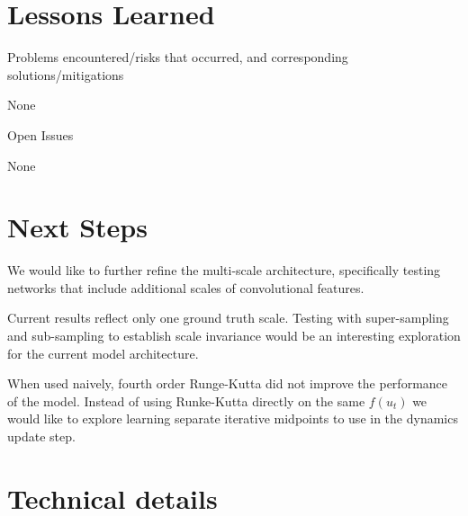 \documentclass[12pt]{article}
\theoremstyle{plain}
\theoremstyle{remark}
\theoremstyle{definition}
\begin{document}
\section{Lessons Learned}


\noindent Problems encountered/risks that occurred, and corresponding solutions/mitigations

None

\noindent Open Issues

None

\section{Next Steps}

\noindent We would like to further refine the multi-scale architecture, specifically testing networks that include additional scales of convolutional features.


\noindent Current results reflect only one ground truth scale. Testing with super-sampling and sub-sampling to establish scale invariance would be an interesting exploration for the current model architecture.

\noindent When used naively, fourth order Runge-Kutta did not improve the performance of the model. Instead of using Runke-Kutta directly on the same $f(u_t)$ we would like to explore learning separate iterative midpoints to use in the dynamics update step.  


\section{Technical details}
\end{document}
